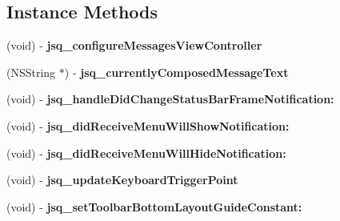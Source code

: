 \subsection*{Instance Methods}
\begin{DoxyCompactItemize}
\item 
\hypertarget{category_j_s_q_messages_view_controller_07_08_aa42d617606fa7fd8e161d95881ddd2c8}{}(void) -\/ {\bfseries jsq\+\_\+configure\+Messages\+View\+Controller}\label{category_j_s_q_messages_view_controller_07_08_aa42d617606fa7fd8e161d95881ddd2c8}

\item 
\hypertarget{category_j_s_q_messages_view_controller_07_08_af991b1eb4691174ea37cf7058d1bf947}{}(N\+S\+String $\ast$) -\/ {\bfseries jsq\+\_\+currently\+Composed\+Message\+Text}\label{category_j_s_q_messages_view_controller_07_08_af991b1eb4691174ea37cf7058d1bf947}

\item 
\hypertarget{category_j_s_q_messages_view_controller_07_08_a7a292580a4df60e83164b91de040552e}{}(void) -\/ {\bfseries jsq\+\_\+handle\+Did\+Change\+Status\+Bar\+Frame\+Notification\+:}\label{category_j_s_q_messages_view_controller_07_08_a7a292580a4df60e83164b91de040552e}

\item 
\hypertarget{category_j_s_q_messages_view_controller_07_08_ad0f38b8aa5994d6d704347354290f14e}{}(void) -\/ {\bfseries jsq\+\_\+did\+Receive\+Menu\+Will\+Show\+Notification\+:}\label{category_j_s_q_messages_view_controller_07_08_ad0f38b8aa5994d6d704347354290f14e}

\item 
\hypertarget{category_j_s_q_messages_view_controller_07_08_a535af43de119be50ec924f5bf8142e50}{}(void) -\/ {\bfseries jsq\+\_\+did\+Receive\+Menu\+Will\+Hide\+Notification\+:}\label{category_j_s_q_messages_view_controller_07_08_a535af43de119be50ec924f5bf8142e50}

\item 
\hypertarget{category_j_s_q_messages_view_controller_07_08_a747da4c11a3451653973573122911f92}{}(void) -\/ {\bfseries jsq\+\_\+update\+Keyboard\+Trigger\+Point}\label{category_j_s_q_messages_view_controller_07_08_a747da4c11a3451653973573122911f92}

\item 
\hypertarget{category_j_s_q_messages_view_controller_07_08_a381e27ce30947a11180d9bfd2b4c0e7a}{}(void) -\/ {\bfseries jsq\+\_\+set\+Toolbar\+Bottom\+Layout\+Guide\+Constant\+:}\label{category_j_s_q_messages_view_controller_07_08_a381e27ce30947a11180d9bfd2b4c0e7a}


\end{DoxyCompactItemize}

